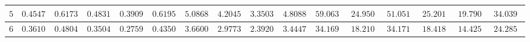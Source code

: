 \begin{table}[]
\begin{tabular}{|c|c|c|c|c|c|c|c|c|c|c|c|c|c|c|c}
$5$          & $0.454700$                                                        & $0.617300$                                                        & $0.483100$                                                          & $0.390900$                                                           & $0.619500$                                                              & $5.086800$                                                        & $4.204500$                                                          & $3.350300$                                                           & $4.808800$                                                              & $59.063100$                                                       & $24.950900$                                                         & $51.051680$                                                       & $25.201030$                                                         & $19.790460$                                                          & \multicolumn{1}{c|}{$34.039850$}                                                             \\ \hline
$6$          & $0.361000$                                                        & $0.480400$                                                        & $0.350400$                                                          & $0.275900$                                                           & $0.435000$                                                              & $3.660000$                                                        & $2.977300$                                                          & $2.392000$                                                           & $3.444700$                                                              & $34.169400$                                                       & $18.210100$                                                         & $34.171690$                                                       & $18.418570$                                                         & $14.425510$                                                          & \multicolumn{1}{c|}{$24.285430$}                                                             \\ \hline

\end{tabular}
\end{table}
